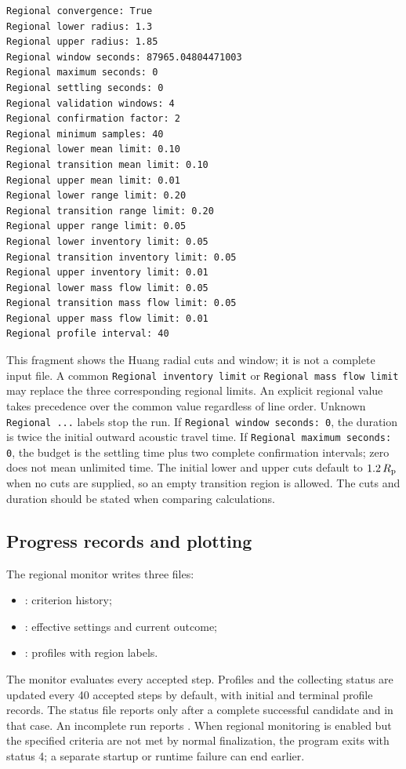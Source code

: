 \begin{lstlisting}[style=cfg]
Regional convergence: True
Regional lower radius: 1.3
Regional upper radius: 1.85
Regional window seconds: 87965.04804471003
Regional maximum seconds: 0
Regional settling seconds: 0
Regional validation windows: 4
Regional confirmation factor: 2
Regional minimum samples: 40
Regional lower mean limit: 0.10
Regional transition mean limit: 0.10
Regional upper mean limit: 0.01
Regional lower range limit: 0.20
Regional transition range limit: 0.20
Regional upper range limit: 0.05
Regional lower inventory limit: 0.05
Regional transition inventory limit: 0.05
Regional upper inventory limit: 0.01
Regional lower mass flow limit: 0.05
Regional transition mass flow limit: 0.05
Regional upper mass flow limit: 0.01
Regional profile interval: 40
\end{lstlisting}

This fragment shows the Huang radial cuts and window; it is not a complete
input file. A common \texttt{Regional inventory limit} or
\texttt{Regional mass flow limit} may replace the three corresponding regional
limits. An explicit regional value takes precedence over the common value
regardless of line order. Unknown \texttt{Regional ...} labels stop the run.
If \texttt{Regional window seconds: 0}, the duration is twice the initial
outward acoustic travel time. If \texttt{Regional maximum seconds: 0}, the
budget is the settling time plus two complete confirmation intervals; zero
does not mean unlimited time. The initial lower and upper cuts default to
$1.2\,R_{\rm p}$ when no cuts are supplied, so an empty transition region is
allowed. The cuts and duration should be stated when comparing calculations.

\subsection{Progress records and plotting}

The regional monitor writes three files:
\begin{itemize}
\item {}: criterion history;
\item {}: effective settings and
current outcome;
\item {}: profiles with region labels.
\end{itemize}
The monitor evaluates every accepted step. Profiles and the collecting status
are updated every 40 accepted steps by default, with initial and terminal
profile records. The status file reports
 only after a complete
successful candidate and  in that case.
An incomplete run reports . When regional
monitoring is enabled but the specified criteria are not met by normal
finalization, the program exits with status 4; a separate startup or runtime
failure can end earlier.

